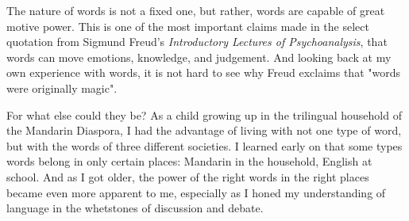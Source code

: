 The nature of words is not a fixed one, but rather, words are capable of great motive power. This is one of the most important claims made in the select quotation from Sigmund Freud's \emph{Introductory Lectures of Psychoanalysis}, that words can move emotions, knowledge, and judgement. And looking back at my own experience with words, it is not hard to see why Freud exclaims that "words were originally magic".

For what else could they be? As a child growing up in the trilingual household of the Mandarin Diaspora, I had the advantage of living with not one type of word, but with the words of three different societies. I learned early on that some types words belong in only certain places: Mandarin in the household, English at school. And as I got older, the power of the right words in the right places became even more apparent to me, especially as I honed my understanding of language in the whetstones of discussion and debate.




